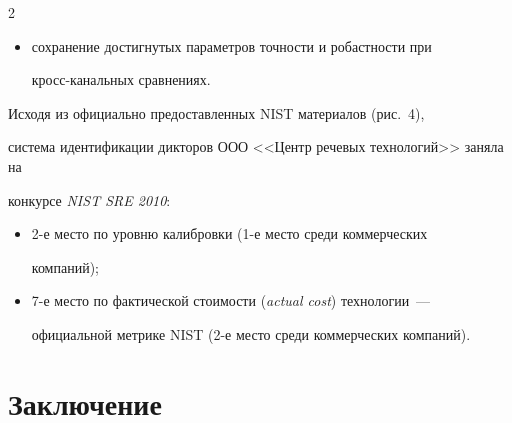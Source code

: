   


  \renewcommand{\figurename}{\protect\bf Рис.}


\renewcommand{\tablename}{\protect\bf Таблица}





\begin{multicols}{2}





\noindent


\begin{itemize}


\item сохранение достигнутых параметров точности и робастности при 


кросс-ка\-наль\-ных сравнениях.


\end{itemize}








  Исходя из официально предоставленных {NIST} материалов (рис.~4), 


система идентификации дикторов ООО <<Центр речевых технологий>> заняла на 


конкурсе \textit{NIST SRE 2010}:


  \begin{itemize}


\item 2-е место по уровню калибровки (1-е место среди коммерческих 


компаний);


\item 7-е место по фактической стоимости (\textit{actual cost}) технологии~--- 


официальной метрике {NIST} (2-е место среди коммерческих компаний).


\end{itemize}







  


\section{Заключение}






\end{multicols}
